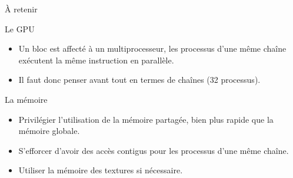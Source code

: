 \begin{frame}{\`A retenir}
\begin{block}{Le GPU}
   \begin{itemize}
    \item<+-> Un bloc est affecté à un multiprocesseur, les processus d'une même chaîne exécutent la même instruction
    en parallèle.
    \item<+-> Il faut donc penser avant tout en termes de chaînes (32 processus).
   \end{itemize} 
\end{block}
\begin{block}{La mémoire}
  \begin{itemize}
   \item<+-> Privilégier l'utilisation de la mémoire partagée, bien plus rapide que la mémoire globale.
   \item<+-> S'efforcer d'avoir des accès contigus pour les processus d'une même chaîne.
   \item<+-> Utiliser la mémoire des textures si nécessaire.
  \end{itemize} 
\end{block}
\end{frame}
